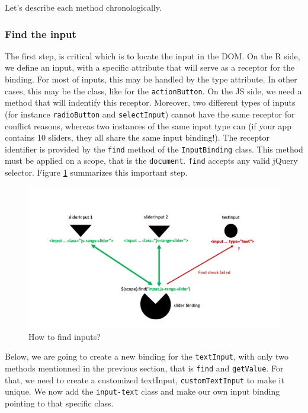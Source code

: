 \documentclass[
]{book}
\begin{document}
Let's describe each method chronologically.

\hypertarget{find-the-input}{%
\subsubsection{Find the input}\label{find-the-input}}

The first step, is critical which is to locate the input in the DOM. On the R side, we define an input, with a specific attribute that will serve as a receptor for the binding. For most of inputs, this may be handled by the type attribute. In other cases, this may be the class, like for the \texttt{actionButton}. On the JS side, we need a method that will indentify this receptor. Moreover, two different types of inputs (for instance \texttt{radioButton} and \texttt{selectInput}) cannot have the same receptor for conflict reasons, whereas two instances of the same input type can (if your app contains 10 sliders, they all share the same input binding!). The receptor identifier is provided by the \texttt{find} method of the \texttt{InputBinding} class. This method must be applied on a scope, that is the \texttt{document}. \texttt{find} accepts any valid jQuery selector. Figure \ref{fig:shiny-find-inputs} summarizes this important step.

\begin{figure}
\includegraphics[width=20in]{images/survival-kit/shiny-find-inputs} \caption{How to find inputs?}\label{fig:shiny-find-inputs}
\end{figure}

Below, we are going to create a new binding for the \texttt{textInput}, with only two methods mentionned in the previous section, that is \texttt{find} and \texttt{getValue}. For that, we need to create a customized textInput, \texttt{customTextInput} to make it unique. We now add the \texttt{input-text} class and make our own input binding pointing to that specific class.
\end{document}
